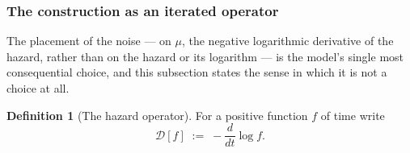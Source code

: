 \documentclass[11pt]{article}
\numberwithin{equation}{section}
\theoremstyle{plain}
\theoremstyle{definition}
\newtheorem{definition}[theorem]{Definition}
\theoremstyle{remark}
\begin{document}
\subsubsection{The construction as an iterated operator}
\label{gr1:subsub:operator}

The placement of the noise --- on $\mu$, the negative logarithmic
derivative of the hazard, rather than on the hazard or its logarithm ---
is the model's single most consequential choice, and this subsection
states the sense in which it is not a choice at all.

\begin{definition}[The hazard operator]\label{gr1:def:operator}
For a positive function $f$ of time write
\begin{equation}\label{gr1:eq:operator}
\mathcal D[f]\;:=\;-\frac{d}{dt}\log f .
\end{equation}
\end{definition}
\end{document}
